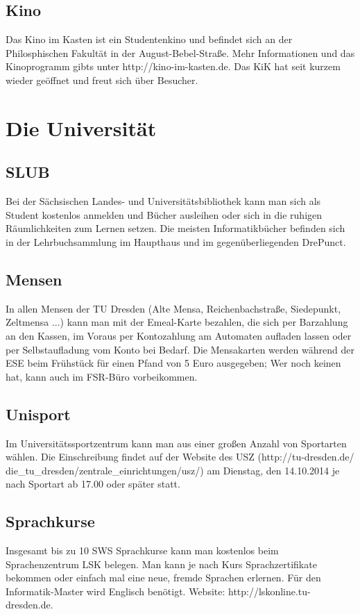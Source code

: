 \documentclass[a4paper,12pt]{report}
\begin{document}
\subsection{Kino}
Das Kino im Kasten ist ein Studentenkino und befindet sich an der Philosphischen Fakultät in der August-Bebel-Straße. Mehr Informationen und das Kinoprogramm gibts unter http://kino-im-kasten.de. Das KiK hat seit kurzem wieder geöffnet und freut sich über Besucher.

\section{Die Universität}
\subsection{SLUB}
Bei der Sächsischen Landes- und Universitätsbibliothek kann man sich als Student kostenlos anmelden und Bücher ausleihen oder sich in die ruhigen Räumlichkeiten zum Lernen setzen. Die meisten Informatikbücher befinden sich in der Lehrbuchsammlung im Haupthaus und im gegenüberliegenden \glqq DrePunct\grqq.
\subsection{Mensen}
In allen Mensen der TU Dresden (Alte Mensa, Reichenbachstraße, Siedepunkt, Zeltmensa ...) kann man mit der \glqq Emeal\grqq-Karte bezahlen, die sich per Barzahlung an den Kassen, im Voraus per Kontozahlung am Automaten aufladen lassen oder per Selbstaufladung vom Konto bei Bedarf. Die Mensakarten werden während der ESE beim Frühstück für einen Pfand von 5 Euro ausgegeben; Wer noch keinen hat, kann auch im FSR-Büro vorbeikommen.

\subsection{Unisport}
Im Universitätssportzentrum kann man aus einer großen Anzahl von Sportarten wählen. Die Einschreibung findet auf der Website des USZ (http://tu-dresden.de/ die\_tu\_dresden/zentrale\_einrichtungen/usz/) am Dienstag, den 14.10.2014 je nach Sportart ab 17.00 oder später statt.

\subsection{Sprachkurse}
Insgesamt bis zu 10 SWS Sprachkurse kann man kostenlos beim Sprachenzentrum LSK belegen. Man kann je nach Kurs Sprachzertifikate bekommen oder einfach mal eine neue, fremde Sprachen erlernen. Für den Informatik-Master wird Englisch benötigt. Website: http://lskonline.tu-dresden.de.
\end{document}
